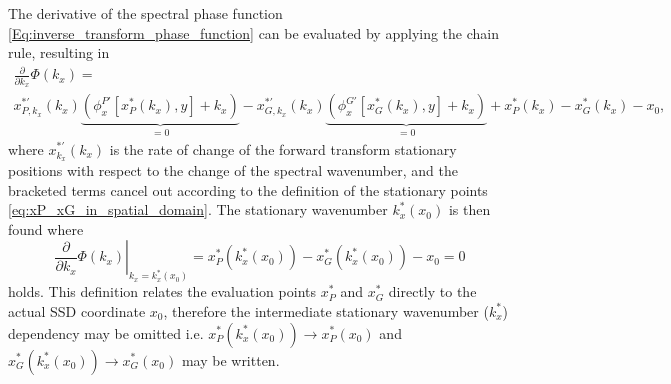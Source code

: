 The derivative of the spectral phase function \eqref{Eq:inverse_transform_phase_function} can be evaluated by applying the chain rule, resulting in
\begin{multline}
\label{eq:spectral_phase_first_derivative}
\frac{\partial}{\partial k_x}\Phi(k_x) = \\ 
  x^{*'}_{P,k_x}(k_x) \underbrace{ \left( \phi^{P'}_x[x^*_P(k_x),y]  + k_x \right)}_{ = 0} 
- x^{*'}_{G,k_x}(k_x) \underbrace{ \left( \phi^{G'}_x[x^*_G(k_x),y]  + k_x \right) }_{ = 0} 
+x^*_P(k_x)- x^*_G(k_x) -  x_0,
\end{multline}
where $x^{*'}_{k_x}(k_x)$ is the rate of change of the forward transform stationary positions with respect to the change of the spectral wavenumber, and the bracketed terms cancel out according to the definition of the stationary points \eqref{eq:xP_xG_in_spatial_domain}.
The stationary wavenumber $k_x^*(x_0)$ is then found where
\begin{equation}
\label{eq:xP_xG_in_spectral_domain}
\left. \frac{\partial}{\partial k_x}\Phi(k_x) \right|_{k_x=k_x^*(x_0)} = x^*_P(k_x^*(x_0))- x^*_G(k_x^*(x_0)) -  x_0 = 0
\end{equation}
holds.
This definition relates the evaluation points $x^*_P$ and $x^*_G$ directly to the actual SSD coordinate $x_0$, therefore the intermediate stationary wavenumber ($k_x^*$) dependency may be omitted i.e. $x^*_P(k_x^*(x_0)) \rightarrow x^*_P(x_0)$ and $x^*_G(k_x^*(x_0)) \rightarrow x^*_G(x_0)$ may be written. 

